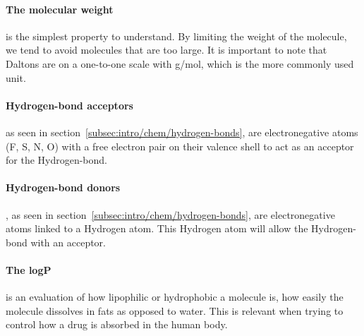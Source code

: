 \documentclass[../Document.tex]{subfiles}
\begin{document}
\paragraph{The molecular weight} is the simplest property to understand. By limiting the weight of the molecule, we tend to avoid molecules that are too large. It is important to note that Daltons are on a one-to-one scale with g/mol, which is the more commonly used unit. 

\paragraph{Hydrogen-bond acceptors} as seen in section~\ref{subsec:intro/chem/hydrogen-bonds}, are electronegative atoms (\eg F, S, N, O) with a free electron pair on their valence shell to act as an acceptor for the Hydrogen-bond.

\paragraph{Hydrogen-bond donors}, as seen in section~\ref{subsec:intro/chem/hydrogen-bonds}, are electronegative atoms linked to a Hydrogen atom. This Hydrogen atom will allow the Hydrogen-bond with an acceptor.

\paragraph{The logP} is an evaluation of how lipophilic or hydrophobic a molecule is, \ie how easily the molecule dissolves in fats as opposed to water. This is relevant when trying to control how a drug is absorbed in the human body.
\end{document}
